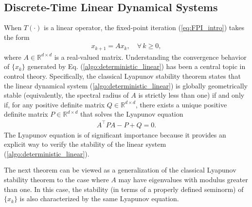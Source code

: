 \documentclass[11 pt]{article}
\begin{document}
	
	
	
	\subsection{Discrete-Time Linear Dynamical Systems}
	When $T(\cdot)$ is a linear operator, the fixed-point iteration (\ref{eq:FPI_intro}) takes the form  
	\begin{align}\label{algo:deterministic_linear}
		x_{k+1} = Ax_k, \quad \forall\, k \geq 0,
	\end{align}  
	where $A\in\mathbb{R}^{d\times d}$ is a real-valued matrix. Understanding the convergence behavior of $\{x_k\}$ generated by Eq. (\ref{algo:deterministic_linear}) has been a central topic in control theory. Specifically, the classical Lyapunov stability theorem \cite{khalil2002nonlinear} states that the linear dynamical system (\ref{algo:deterministic_linear}) is globally geometrically stable (equivalently, the spectral radius of $A$ is strictly less than one) if and only if, for any positive definite matrix $Q\in\mathbb{R}^{d\times d}$, there exists a unique positive definite matrix $P\in\mathbb{R}^{d\times d}$ that solves the Lyapunov equation 
	\begin{align}\label{eq:discrete Lyapunov equation}
		A^\top P A - P + Q = 0.
	\end{align}
	The Lyapunov equation is of significant importance because it provides an explicit way to verify the stability of the linear system (\ref{algo:deterministic_linear}).
	
	The next theorem can be viewed as a generalization of the classical Lyapunov stability theorem to the case where $A$ may have eigenvalues with modulus greater than one. In this case, the stability (in terms of a properly defined seminorm) of $\{x_k\}$ is also characterized by the same Lyapunov equation.
	
\end{document}
